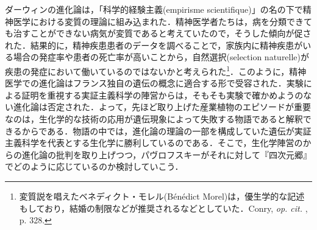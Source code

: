 
ダーウィンの進化論は，「科学的経験主義(empirisme scientifique)」の名の下で精神医学における変質の理論に組み込まれた．精神医学者たちは，病を分類できても治すことができない病気が変質であると考えていたので，そうした傾向が促された．結果的に，精神疾患患者のデータを調べることで，家族内に精神疾患がいる場合の発症率や患者の死亡率が高いことから，自然選択(selection naturelle)が疾患の発症において働いているのではないかと考えられた\footnote{変質説を唱えたベネディクト・モレル(Bénédict Morel)は，優生学的な記述もしており，結婚の制限などが推奨されるなどとしていた．Conry, \emph{op. cit. }, p. 328.}．このように，精神医学での進化論はフランス独自の遺伝の概念に適合する形で受容された．実験による証明を重視する実証主義科学の陣営からは，そもそも実験で確かめようのない進化論は否定された．よって，先ほど取り上げた産業植物のエピソードが重要なのは，生化学的な技術の応用が遺伝現象によって失敗する物語であると解釈できるからである．物語の中では，進化論の理論の一部を構成していた遺伝が実証主義科学を代表とする生化学に勝利しているのである．そこで，生化学陣営のからの進化論の批判を取り上げつつ，パヴロフスキーがそれに対して『四次元郷』でどのように応じているのか検討していこう．

